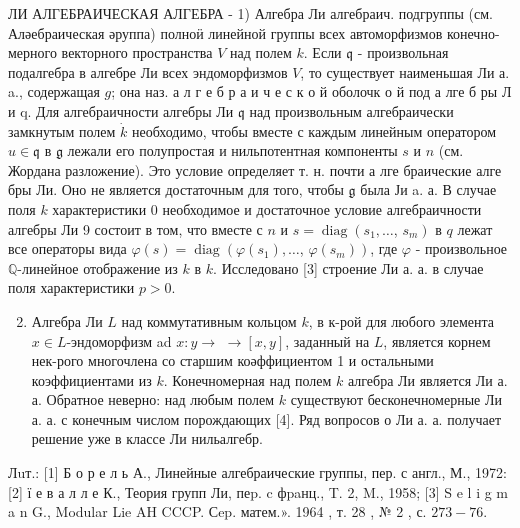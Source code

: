 \documentclass[10pt]{article}
\begin{document}
ЛИ АЛГЕБРАИЧЕСКАЯ АЛГЕБРА - 1) Алгебра Ли алгебраич. подгруппы (см. Аләебраическая әруппа) полноӥ линейной группы всех автоморфизмов конечно- мерного векторного пространства $V$ над полем $k$. Если $\mathfrak{q}$ - произвольная подалгебра в алгебре Ли всех эндоморфизмов $V$, то существует наименьшая Ли а. a., содержащая $g$; она наз. а л г е б р а и ч е с к о й оболочк о й под а лге б ры Л и q. Для алгебраичности алгебры Ли $\mathfrak{q}$ над произвольным алгебраически замкнутым полем $\dot{k}$ необходимо, чтобы вместе с каждым линейным оператором $u \in \mathfrak{q}$ в $\mathfrak{g}$ лежали его полупростая и нильпотентная компоненты $s$ и $n$ (см. Жордана разложение). Это условие определяет т. н. почти а лге браические алге бры Ли. Оно не является достаточным для того, чтобы $\mathfrak{g}$ была Ји a. а. В случае поля $k$ характеристики 0 необходимое и достаточное условие алгебраичности алгебры Ли 9 состоит в том, что вместе с $n$ и $s=\operatorname{diag}\left(s_{1}, \ldots\right.$, $\left.s_{m}\right)$ в $q$ лежат все операторы вида $\varphi(s)=\operatorname{diag}\left(\varphi\left(s_{1}\right), \ldots\right.$, $\left.\varphi\left(s_{m}\right)\right)$, где $\varphi$ - произвольное $\mathbb{Q}$-линейное отображение из $k$ в $k$. Исследовано [3] строение Ли а. а. в случае поля характеристики $p>0$.



\begin{enumerate}

  \setcounter{enumi}{1}

  \item Алгебра Ли $L$ над коммутативным кольцом $k$, в к-рой для любого элемента $x \in L$-эндоморфизм ad $x: y \rightarrow$ $\rightarrow[x, y]$, заданный на $L$, является корнем нек-рого многочлена со старшим коәффициентом 1 и остальными коэффициентами из $k$. Конечномерная над полем $k$ алгебра Ли является Ли а. а. Обратное неверно: над любым полем $k$ существуют бесконечномерные Ли а. а. с конечным числом порождающих [4]. Ряд вопросов о Ли а. а. получает решение уже в классе Ли нильалгебр.

\end{enumerate}



Лuт.: [1] Б о р е л ь А., Линейные алгебраические группы, пер. с англ., М., 1972: [2] ї е в а л л е К., Теория групп Ли, пеp. c фpaнц., T. 2, M., 1958; [3] S e l i g m a n G., Modular Lie AH CCCP. Сep. матем.». 1964 , т. 28 , № 2 , с. $273-76$.
\end{document}
